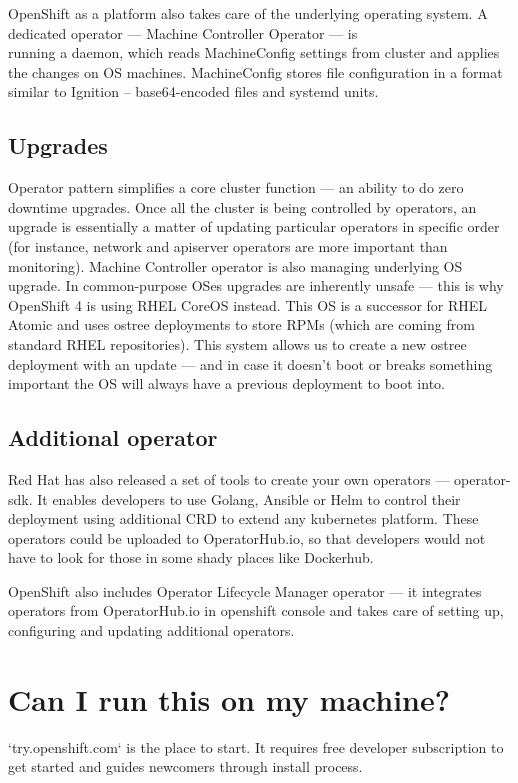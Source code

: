 \documentclass[10pt, a5paper]{article}
\begin{document}
OpenShift as a platform also takes care of the underlying operating system. A dedicated operator ---
Machine Controller Operator --- is \\running a daemon, which reads MachineConfig settings from cluster
and applies the changes on OS machines. MachineConfig stores file configuration in a format similar
to Ignition -- base64-encoded files and systemd units.

\subsection*{Upgrades}

Operator pattern simplifies a core cluster function --- an ability to do zero downtime upgrades. Once
all the cluster is being controlled by operators, an upgrade is essentially a matter of updating
particular operators in specific order (for instance, network and apiserver operators are more
important than monitoring). Machine Controller operator is also managing underlying OS upgrade.
In common-purpose OSes upgrades are inherently unsafe --- this is why OpenShift 4 is using RHEL CoreOS instead.
This OS is a successor for RHEL Atomic and uses ostree deployments to store RPMs (which are coming from
standard RHEL repositories). This system allows us to create a new ostree \\deployment with an update --- and
in case it doesn't boot or breaks something important the OS will always have a previous deployment to boot into.

\subsection*{Additional operator}

Red Hat has also released a set of tools to create your own operators --- operator-sdk. It enables
developers to use Golang, Ansible or Helm to control their deployment using additional CRD to extend
any kubernetes platform. These operators could be uploaded to OperatorHub.io, so that developers
would not have to look for those in some shady places like Dockerhub.

OpenShift also includes Operator Lifecycle Manager operator --- it integrates operators from OperatorHub.io
in openshift console and takes care of setting up, configuring and updating additional operators.

\section*{Can I run this on my machine?}

`try.openshift.com` is the place to start. It requires free developer subscription to get started and guides newcomers through install process.
\end{document}
